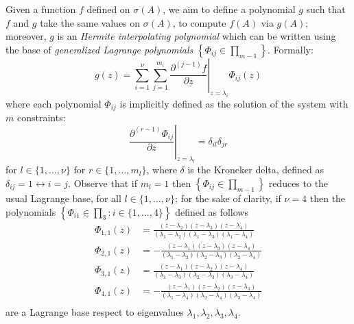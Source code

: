Given a function $f$ defined on $\sigma(A)$, we aim to define a polynomial $g$
such that $f$ and $g$ take the same values on $\sigma(A)$, to compute $f(A)$
via $g(A)$; moreover, $g$ is an \emph{Hermite interpolating polynomial} which
can be written using the base of \textit{generalized Lagrange polynomials}
$\left\lbrace \Phi_{ij}\in\prod_{m-1} \right\rbrace$. Formally:
\begin{displaymath}
g(z) = \sum_{i=1}^{\nu}{\sum_{j=1}^{m_{i}}{ \left.
\frac{\partial^{(j-1)}{f}}{\partial{z}} \right|_{z=\lambda_{i}}\Phi_{ij}(z) }}
\end{displaymath}
where each polynomial $\Phi_{ij}$ is implicitly defined as the solution of the
system with $m$ constraints:
\begin{displaymath}
    \left. \frac{\partial^{(r-1)}{\Phi_{ij}}}{\partial{z}} \right|_{z=\lambda_{l}} = \delta_{il}\delta_{jr}
\end{displaymath}
for $l\in \lbrace 1, \ldots, \nu \rbrace$ for $r \in \lbrace 1, \ldots, m_{l}
\rbrace$, where $\delta$ is the Kroneker delta, defined as $\delta_{ij}=1
\leftrightarrow i=j$.  Observe that if $m_{l}=1$  then $\left\lbrace \Phi_{ij}\in\prod_{m-1} \right\rbrace$
reduces to the usual Lagrange base, for all $l\in\lbrace 1, \ldots, \nu\rbrace$;
for the sake of clarity, if $\nu=4$ then the polynomials $\left\lbrace \Phi_{i1}\in\prod_{3}:i\in\lbrace1,\ldots,4\rbrace \right\rbrace$
defined as follows
\begin{displaymath}
\begin{split}
\Phi_{ 1, 1 }{\left (z \right )} &= \frac{\left(z - \lambda_{2}\right)
\left(z - \lambda_{3}\right) \left(z - \lambda_{4}\right)}{\left(\lambda_{1} -
\lambda_{2}\right) \left(\lambda_{1} - \lambda_{3}\right) \left(\lambda_{1} -
\lambda_{4}\right)} \\ 
\Phi_{ 2, 1 }{\left (z \right )} &= - \frac{\left(z -
\lambda_{1}\right) \left(z - \lambda_{3}\right) \left(z -
\lambda_{4}\right)}{\left(\lambda_{1} - \lambda_{2}\right) \left(\lambda_{2} -
\lambda_{3}\right) \left(\lambda_{2} - \lambda_{4}\right)} \\ 
\Phi_{ 3, 1 }{\left (z \right )} &= \frac{\left(z - \lambda_{1}\right) \left(z -
\lambda_{2}\right) \left(z - \lambda_{4}\right)}{\left(\lambda_{1} -
\lambda_{3}\right) \left(\lambda_{2} - \lambda_{3}\right) \left(\lambda_{3} -
\lambda_{4}\right)} \\ 
\Phi_{ 4, 1 }{\left (z \right )} &= - \frac{\left(z -
\lambda_{1}\right) \left(z - \lambda_{2}\right) \left(z -
\lambda_{3}\right)}{\left(\lambda_{1} - \lambda_{4}\right) \left(\lambda_{2} -
\lambda_{4}\right) \left(\lambda_{3} - \lambda_{4}\right)}\\
\end{split}
\end{displaymath}
are a Lagrange base respect to eigenvalues $\lambda_{1}, \lambda_{2},\lambda_{3},\lambda_{4}$.


